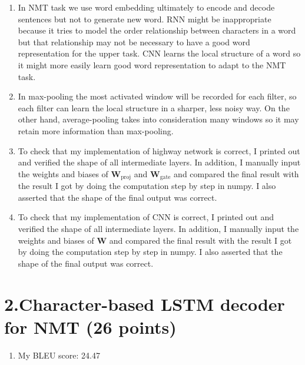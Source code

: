 \documentclass[12pt]{article}
\begin{document}
\begin{enumerate}[label=(\alph*)]
  \item
  In NMT task we use word embedding ultimately to encode and decode sentences but not to generate new word. RNN might be inappropriate because it tries to model the order relationship between characters in a word but that relationship may not be necessary to have a good word representation for the upper task. CNN learns the local structure of a word so it might more easily learn good word representation to adapt to the NMT task.
  \item
  In max-pooling the most activated window will be recorded for each filter, so each filter can learn the local structure in a sharper, less noisy way. On the other hand, average-pooling takes into consideration many windows so it may retain more information than max-pooling.
  \addtocounter{enumi}{3}
  \item To check that my implementation of highway network is correct, I printed out and verified the shape of all intermediate layers. In addition, I manually input the weights and biases of $\mathbf{W}_{\text{proj}}$ and $\mathbf{W}_{\text{gate}}$ and compared the final result with the result I got by doing the computation step by step in numpy. I also asserted that the shape of the final output was correct.
  \item
  To check that my implementation of CNN is correct, I printed out and verified the shape of all intermediate layers. In addition, I manually input the weights and biases of $\mathbf{W}$ and compared the final result with the result I got by doing the computation step by step in numpy. I also asserted that the shape of the final output was correct.
\end{enumerate}

\section*{2.Character-based LSTM decoder for NMT (26 points)}
\begin{enumerate}[label=(\alph*)]
  \addtocounter{enumi}{5}
  \item My BLEU score: 24.47
\end{enumerate}
\end{document}
